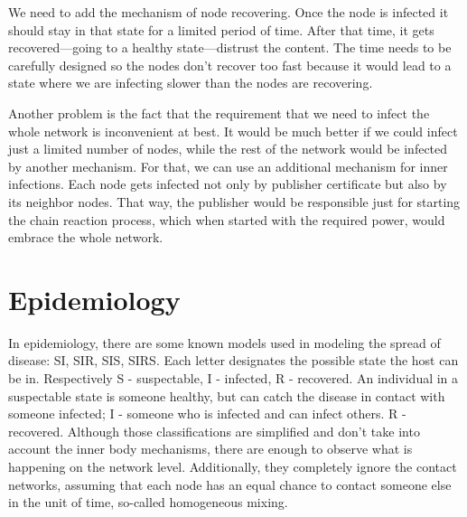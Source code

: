 \documentclass[nostrict]{szablonPG}
\begin{document}
We need to add the mechanism of node recovering. Once the node is infected it should stay in that state for a limited period of time. After that time, it gets recovered––going to a healthy state––distrust the content. The time needs to be carefully designed so the nodes don't recover too fast because it would lead to a state where we are infecting slower than the nodes are recovering. 

Another problem is the fact that the requirement that we need to infect the whole network is inconvenient at best. It would be much better if we could infect just a limited number of nodes, while the rest of the network would be infected by another mechanism.
For that, we can use an additional mechanism for inner infections. Each node gets infected not only by publisher certificate but also by its neighbor nodes. That way, the publisher would be responsible just for starting the chain reaction process, which when started with the required power, would embrace the whole network. 

\section{Epidemiology}
In epidemiology, there are some known models used in modeling the spread of disease: SI, SIR, SIS, SIRS. Each letter designates the possible state the host can be in. Respectively S - suspectable, I - infected, R - recovered. An individual in a suspectable state is someone healthy, but can catch the disease in contact with someone infected; I - someone who is infected and can infect others. R - recovered. Although those classifications are simplified and don't take into account the inner body mechanisms, there are enough to observe what is happening on the network level. Additionally, they completely ignore the contact networks, assuming that each node has an equal chance to contact someone else in the unit of time, so-called homogeneous mixing.
\end{document}
